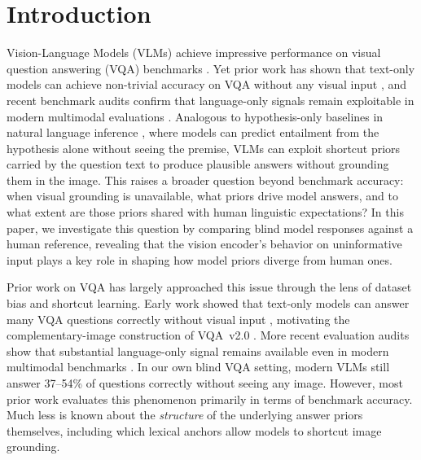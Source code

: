 \documentclass[letterpaper]{article}
\begin{document}
\section{Introduction}

Vision-Language Models (VLMs) achieve impressive performance on visual question
answering (VQA) benchmarks \citep{antol2015vqa,goyal2016making}. Yet prior
work has shown that text-only models can achieve non-trivial accuracy on VQA
without any visual input \citep{jabri2016revisiting,zhang2016yin}, and recent
benchmark audits confirm that language-only signals remain exploitable in
modern multimodal evaluations \citep{chen2024are,lee2024vlind}.
Analogous to hypothesis-only baselines in natural language inference
\citep{poliak2018hypothesis}, where models can predict entailment from the
hypothesis alone without seeing the premise, VLMs can exploit shortcut priors
carried by the question text to produce plausible answers without grounding
them in the image. This raises a broader question beyond benchmark accuracy: when visual
grounding is unavailable, what priors drive model answers, and to what
extent are those priors shared with human linguistic expectations? In this
paper, we investigate this question by comparing blind model responses
against a human reference, revealing that the vision encoder's behavior on
uninformative input plays a key role in shaping how model priors diverge
from human ones.

Prior work on VQA has largely approached this issue through the lens of
dataset bias and shortcut learning. Early work showed that text-only models
can answer many VQA questions correctly without visual input
\citep{jabri2016revisiting,zhang2016yin}, motivating the complementary-image
construction of VQA~v2.0 \citep{goyal2016making}. More recent evaluation
audits show that substantial language-only signal remains available even in
modern multimodal benchmarks \citep{chen2024are,lee2024vlind}. In our own
blind VQA setting, modern VLMs still answer 37--54\% of questions correctly
without seeing any image. However, most prior work evaluates this phenomenon
primarily in terms of benchmark accuracy. Much less is known about the
\emph{structure} of the underlying answer priors themselves, including which
lexical anchors allow models to shortcut image grounding.
\end{document}
